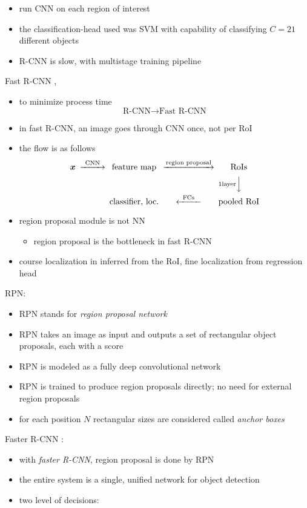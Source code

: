 \documentclass[onecolumn]{IEEEtran}
\newcommand{\beq}{\begin{equation}}
\newcommand{\eeq}{\end{equation}}
\newcommand{\bi}{\begin{itemize}}
\newcommand{\ei}{\end{itemize}}
\begin{document}
\begin{itemize}
        \item run CNN on each region of interest
        \item the classification-head used was SVM with capability of classifying $C=21$ different objects
        \item R-CNN is slow, with multistage training pipeline
    \ei
    \item Fast R-CNN \cite{fastrcnn},
    \bi
        \item to minimize process time
        \beq
            \text{R-CNN} \rightarrow  \text{Fast R-CNN}
        \eeq
        \item in fast R-CNN, an image goes through CNN once, not per RoI
        \item the flow is as follows
        \beq\begin{CD}
            \bm{x} @>\text{CNN}>> \text{feature map} @>\text{region proposal}>> \text{RoIs}\\
            @. @. @V1 \text{layer}VV \\
            @.\text{classifier, loc.} @<\text{FCs}<< \text{pooled RoI}
        \end{CD}\eeq
        \item region proposal module is not NN
        \bi
            \item region proposal is the bottleneck in fast R-CNN
        \ei
        \item course localization in inferred from the RoI, fine localization from regression head
    \ei
    \item RPN:
    \bi
        \item RPN stands for \emph{region proposal network}
         \item RPN takes an image as input and outputs a set of rectangular object proposals, each with a score
         \item RPN is modeled as a fully deep convolutional network
         \item RPN is trained to produce region proposals directly; no need for external region proposals
         \item for each position $N$ rectangular sizes are considered called \emph{anchor boxes}
    \ei
    \item Faster R-CNN \cite{fasterrcnn}:
    \bi
        \item with \emph{faster R-CNN}, region proposal is done by RPN
        \item the entire system is a single, unified network for object detection
        \item two level of decisions:

\end{itemize}
\end{document}
